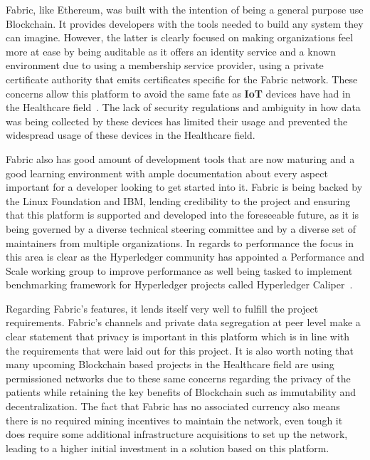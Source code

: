 Fabric, like Ethereum, was built with the intention of being a general purpose
use Blockchain. It provides developers with the tools needed to build any
system they can imagine. However, the latter is clearly focused on making
organizations feel more at ease by being auditable as it offers an identity
service and a known environment due to using a membership service provider,
using a private certificate authority that emits certificates specific for the
Fabric network. These concerns allow this platform to avoid the same fate as
\textbf{IoT} devices have had in the Healthcare field~\cite{Tana2017}. The lack
of security regulations and ambiguity in how data was being collected by these
devices has limited their usage and prevented the widespread usage of these
devices in the Healthcare field.

Fabric also has good amount of development tools that are now maturing and a
good learning environment with ample documentation about every aspect important
for a developer looking to get started into it. Fabric is being backed by the
Linux Foundation and IBM, lending credibility to the project and ensuring that
this platform is supported and developed into the foreseeable future, as it is
being governed by a diverse technical steering committee and by a diverse set
of maintainers from multiple organizations. In regards to performance the focus
in this area is clear as the Hyperledger community has appointed a Performance
and Scale working group to improve performance as well being tasked to
implement benchmarking framework for Hyperledger projects called Hyperledger
Caliper~\cite{performanceScale2017}.

Regarding Fabric's features, it lends itself very well to fulfill the project
requirements. Fabric's channels and private data segregation at peer level make
a clear statement that privacy is important in this platform which is in line
with the requirements that were laid out for this project. It is also worth
noting that many upcoming Blockchain based projects in the Healthcare field are
using permissioned networks due to these same concerns regarding the privacy of
the patients while retaining the key benefits of Blockchain such as
immutability and decentralization. The fact that Fabric has no associated
currency also means there is no required mining incentives to maintain the
network, even tough it does require some additional infrastructure acquisitions
to set up the network, leading to a higher initial investment in a solution
based on this platform.

